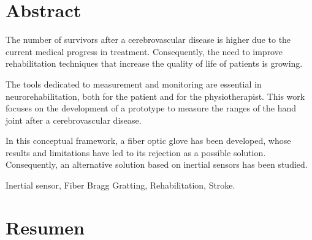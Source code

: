 \chapter*{Abstract}

\begin{abstractEn} 
The number of survivors after a cerebrovascular disease is higher due to the current medical progress in treatment. Consequently, the need to improve rehabilitation techniques that increase the quality of life of patients is growing.

The tools dedicated to measurement and monitoring are essential in neurorehabilitation, both for the patient and for the physiotherapist. This work focuses on the development of a prototype to measure the ranges of the hand joint after a cerebrovascular disease.

In this conceptual framework, a fiber optic glove has been developed, whose results and limitations have led to its rejection as a possible solution. Consequently, an alternative solution based on inertial sensors has been studied.



\end{abstractEn}

\begin{keywordsEn}
Inertial sensor, Fiber Bragg Gratting, Rehabilitation, Stroke.
\end{keywordsEn}

\chapter*{Resumen}

